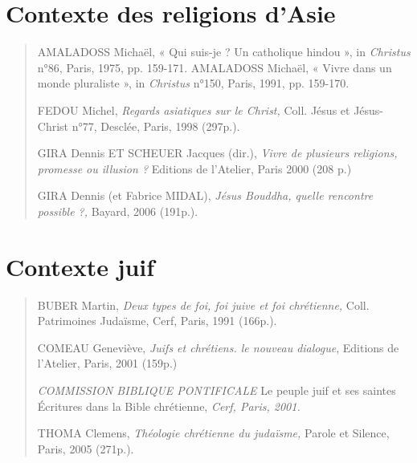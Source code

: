 \hypertarget{contexte-des-religions-dasie}{%
\section{Contexte des religions
d'Asie}\label{contexte-des-religions-dasie}}

\begin{quote}
AMALADOSS Michaël, « Qui suis-je ? Un catholique hindou », in
\emph{Christus} n°86, Paris, 1975, pp. 159-171. AMALADOSS Michaël, «
Vivre dans un monde pluraliste », in \emph{Christus} n°150, Paris, 1991,
pp. 159-170.

FEDOU Michel, \emph{Regards asiatiques sur le Christ,} Coll. Jésus et
Jésus-Christ n°77, Desclée, Paris, 1998 (297p.).

GIRA Dennis ET SCHEUER Jacques (dir.), \emph{Vivre de plusieurs
religions, promesse ou illusion ?} Editions de l'Atelier, Paris 2000
(208 p.)

GIRA Dennis (et Fabrice MIDAL), \emph{Jésus Bouddha, quelle rencontre
possible ?,} Bayard, 2006 (191p.).
\end{quote}

\hypertarget{contexte-juif}{%
\section{Contexte juif}\label{contexte-juif}}

\begin{quote}
BUBER Martin, \emph{Deux types de foi, foi juive et foi chrétienne,}
Coll. Patrimoines Judaïsme, Cerf, Paris, 1991 (166p.).

COMEAU Geneviève, \emph{Juifs et chrétiens. le nouveau dialogue},
Editions de l'Atelier, Paris, 2001 (159p.)

\emph{COMMISSION BIBLIQUE PONTIFICALE} Le peuple juif et ses saintes
Écritures dans la Bible chrétienne, \emph{Cerf, Paris, 2001.}

THOMA Clemens, \emph{Théologie chrétienne du judaïsme,} Parole et
Silence, Paris, 2005 (271p.).
\end{quote}


